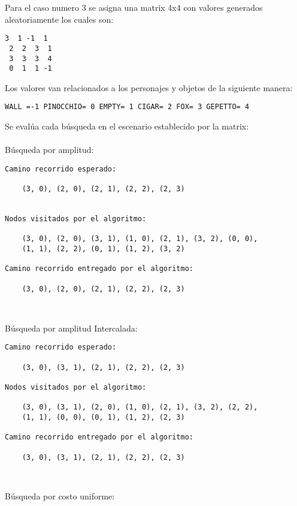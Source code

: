 
Para el caso numero 3 se asigna una matrix 4x4 con valores generados aleatoriamente los cuales son:

\begin{lstlisting}[style=myStyle]
 3  1 -1  1
 2  2  3  1 
 3  3  3  4
 0  1  1 -1
\end{lstlisting}

Los valores van relacionados a los personajes y objetos de la siguiente manera:
\begin{lstlisting}[style=myStyle]
WALL =-1 PINOCCHIO= 0 EMPTY= 1 CIGAR= 2 FOX= 3 GEPETTO= 4
\end{lstlisting}
Se evalúa cada búsqueda en el escenario establecido por la matrix:\\\\
Búsqueda por amplitud:\\

\begin{lstlisting}[]
Camino recorrido esperado:

    (3, 0), (2, 0), (2, 1), (2, 2), (2, 3)
    

Nodos visitados por el algoritmo:

    (3, 0), (2, 0), (3, 1), (1, 0), (2, 1), (3, 2), (0, 0),
    (1, 1), (2, 2), (0, 1), (1, 2), (3, 2)
 
Camino recorrido entregado por el algoritmo:
    
    (3, 0), (2, 0), (2, 1), (2, 2), (2, 3)

    
\end{lstlisting}
\clearpage
Búsqueda por amplitud Intercalada:\\
\begin{lstlisting}[]
Camino recorrido esperado:

    (3, 0), (3, 1), (2, 1), (2, 2), (2, 3)

Nodos visitados por el algoritmo:

    (3, 0), (3, 1), (2, 0), (1, 0), (2, 1), (3, 2), (2, 2), 
    (1, 1), (0, 0), (0, 1), (1, 2), (2, 3)

Camino recorrido entregado por el algoritmo:
    
    (3, 0), (3, 1), (2, 1), (2, 2), (2, 3)

    
\end{lstlisting}

Búsqueda por costo uniforme:\\

